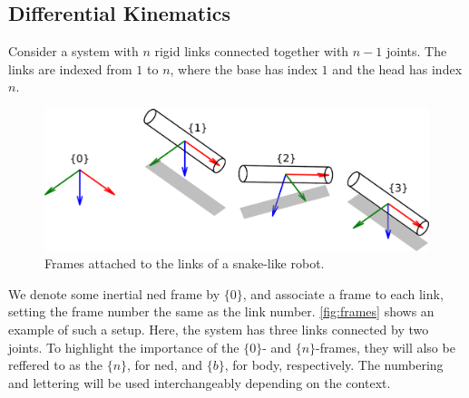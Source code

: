 \subsection{Differential Kinematics}

Consider a system with $n$ rigid links connected together with $n-1$ joints. The
links are indexed from $1$ to $n$, where the base
has index $1$ and the head has index $n$.
\begin{figure}[h!]
    \centering
    \includegraphics[width=\textwidth]{assets/frames_thin.pdf}
    \caption{Frames attached to the links of a snake-like robot.}
    \label{fig:frames}
\end{figure}
We denote some inertial \gls{ned} frame by $\{0\}$, and associate a frame to each link,
setting the frame number the same as the link number.
\autoref{fig:frames} shows an example of such a setup. Here, the system has
three links connected by two joints. To highlight the importance of the $\{0\}$-
and $\{n\}$-frames, they will also be reffered to as the $\{n\}$, for \gls{ned}, and
$\{b\}$, for body, respectively. The numbering and lettering will be used interchangeably
depending on the context.

